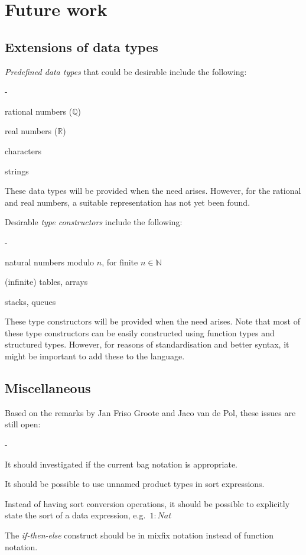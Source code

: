 \documentclass[a4paper,fleqn]{article}
\newenvironment{tdefinitions}[2][0.15em]
  {\begin{list}%
    {#2}%
    {\setlength{\parsep}{0pt}%
     \setlength{\itemsep}{#1}%
     \setlength{\leftmargin}{\mathindent}%
     \setlength{\labelwidth}{\mathindent - \labelsep}%
    }
  }
  {\end{list}}
\newcommand{\frm}[1]{\mbox{\ensuremath{#1}}}
\newcommand{\f}[1]{\ensuremath{\mathit{#1}}}
\newcommand{\nat}{\ensuremath{\mathbb{N}}}
\newlength{\tlength}
\begin{document}
\section{Future work}

\subsection{Extensions of data types}

\emph{Predefined data types} that could be desirable include the following:
\begin{tdefinitions}{-}
\item rational numbers (\frm{\mathbb{Q}})
\item real numbers (\frm{\mathbb{R}})
\item characters
\item strings
\end{tdefinitions}

\noindent
These data types will be provided when the need arises. However, for the
rational and real numbers, a suitable representation has not yet been found.

Desirable \emph{type constructors} include the following:
\begin{tdefinitions}{-}
\item natural numbers modulo \frm{n}, for finite \frm{n \in \nat}
\item (infinite) tables, arrays
\item stacks, queues
\end{tdefinitions}

\noindent
These type constructors will be provided when the need arises. Note that most
of these type constructors can be easily constructed using function types and
structured types. However, for reasons of standardisation and better syntax, it
might be important to add these to the language.

\subsection{Miscellaneous}

Based on the remarks by Jan Friso Groote and Jaco van de Pol, these issues are
still open:
\begin{tdefinitions}{-}
\item It should investigated if the current bag notation is appropriate.
\item It should be possible to use unnamed product types in sort expressions.
\item Instead of having sort conversion operations, it should be possible to
explicitly state the sort of a data expression, e.g.\ \frm{1: \f{Nat}}
\item The \emph{if-then-else} construct should be in mixfix notation instead of
function notation.
\end{tdefinitions}
\end{document}

